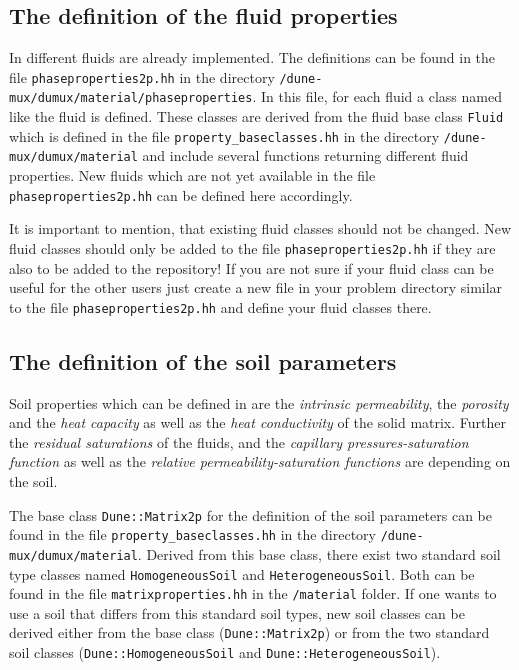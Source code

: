 \subsection{The definition of the fluid properties}\label{tutorial-coupled:description-fluid-class}

In \Dumux different fluids are already implemented. The definitions can be found in the file \texttt{phaseproperties2p.hh} in the directory \texttt{/dune-mux/dumux/material/phaseproperties}. In this file, for each fluid a class named like the fluid is defined. These classes are derived from the fluid base class \texttt{Fluid} which is defined in the file \texttt{property\_baseclasses.hh} in the directory \texttt{/dune-mux/dumux/material} and include several functions returning different fluid properties. New fluids which are not yet available in the file \texttt{phaseproperties2p.hh} can be defined here accordingly.

It is important to mention, that existing fluid classes should not be changed. New fluid classes should only be added to the file \texttt{phaseproperties2p.hh} if they are also to be added to the repository! If you are not sure if your fluid class can be useful for the other \Dumux users just create a new file in your problem directory similar to the file \texttt{phaseproperties2p.hh} and define your fluid classes there.

\subsection{The definition of the soil parameters}\label{tutorial-decoupled:description-soil-class}

Soil properties which can be defined in \Dumux are the \textit{intrinsic permeability}, the \textit{porosity} and the \textit{heat capacity} as well as the \textit{heat conductivity} of the solid matrix. Further the \textit{residual saturations} of the fluids, and the \textit{capillary pressures-saturation function} as well as the \textit{relative permeability-saturation functions} are depending on the soil.

The base class \texttt{Dune::Matrix2p} for the definition of the soil parameters can be found in the file \texttt{property\_baseclasses.hh} in the directory \texttt{/dune-mux/dumux/material}. Derived from this base class, there exist two standard soil type classes named \texttt{HomogeneousSoil} and \texttt{HeterogeneousSoil}. Both can be found in the file \texttt{matrixproperties.hh} in the \texttt{/material} folder. If one wants to use a soil that differs from this standard soil types, new soil classes can be derived either from the base class (\texttt{Dune::Matrix2p}) or from the two standard soil classes (\texttt{Dune::HomogeneousSoil} and \texttt{Dune::HeterogeneousSoil}).

